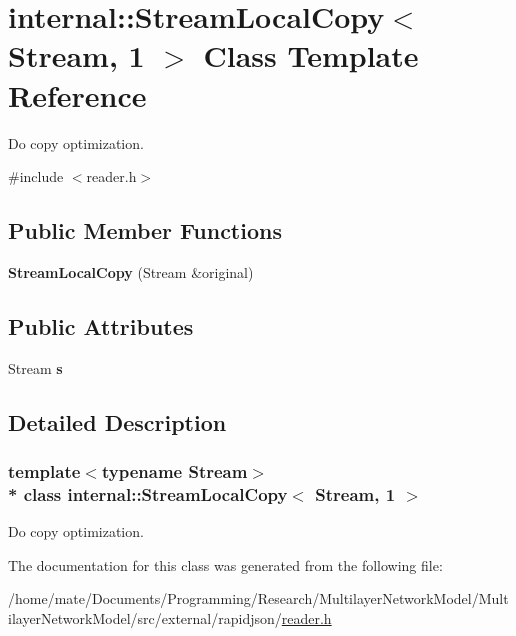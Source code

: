 \hypertarget{classinternal_1_1StreamLocalCopy_3_01Stream_00_011_01_4}{}\section{internal\+:\+:Stream\+Local\+Copy$<$ Stream, 1 $>$ Class Template Reference}
\label{classinternal_1_1StreamLocalCopy_3_01Stream_00_011_01_4}


Do copy optimization.  




{\ttfamily \#include $<$reader.\+h$>$}

\subsection*{Public Member Functions}
\begin{DoxyCompactItemize}
\item 
{\bfseries Stream\+Local\+Copy} (Stream \&original)\hypertarget{classinternal_1_1StreamLocalCopy_3_01Stream_00_011_01_4_aba475fed3eecc9f77ff059fdb7fe2a32}{}\label{classinternal_1_1StreamLocalCopy_3_01Stream_00_011_01_4_aba475fed3eecc9f77ff059fdb7fe2a32}

\end{DoxyCompactItemize}
\subsection*{Public Attributes}
\begin{DoxyCompactItemize}
\item 
Stream {\bfseries s}\hypertarget{classinternal_1_1StreamLocalCopy_3_01Stream_00_011_01_4_a1d3e8ae8756325df25715d4ffb9c1b44}{}\label{classinternal_1_1StreamLocalCopy_3_01Stream_00_011_01_4_a1d3e8ae8756325df25715d4ffb9c1b44}

\end{DoxyCompactItemize}


\subsection{Detailed Description}
\subsubsection*{template$<$typename Stream$>$\\*
class internal\+::\+Stream\+Local\+Copy$<$ Stream, 1 $>$}

Do copy optimization. 

The documentation for this class was generated from the following file\+:\begin{DoxyCompactItemize}
\item 
/home/mate/\+Documents/\+Programming/\+Research/\+Multilayer\+Network\+Model/\+Multilayer\+Network\+Model/src/external/rapidjson/\hyperlink{reader_8h}{reader.\+h}\end{DoxyCompactItemize}
